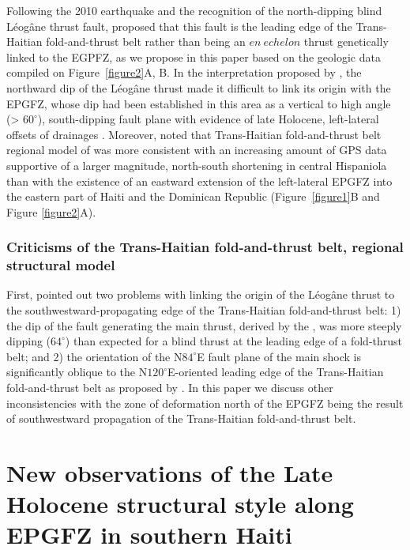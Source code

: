 \documentclass[linenumbers,draft]{agujournal}
\begin{document}
Following the 2010 earthquake and the recognition of the north-dipping blind L\'eog\^ane thrust fault, \citet{calais2010transpressional} proposed that this fault is the leading edge of the Trans-Haitian fold-and-thrust belt rather than being an $en~echelon$ thrust genetically linked to the EGPFZ, as we propose in this paper based on the geologic data compiled on Figure~\ref{figure2}A, B. In the interpretation proposed by \citet{calais2010transpressional}, the northward dip of the L\'eog\^ane thrust made it difficult to link its origin with the EPGFZ, whose dip had been established in this area as a vertical to high angle (> $60^{\circ}$), south-dipping fault plane with evidence of late Holocene, left-lateral offsets of drainages \citep{prentice2010seismic}. Moreover, \citet{symithe2016present} noted that Trans-Haitian fold-and-thrust belt regional model of \citet{pubellier2000plate} was more consistent with an increasing amount of GPS data supportive of a larger magnitude, north-south shortening in central Hispaniola than with the existence of an eastward extension of the left-lateral EPGFZ into the eastern part of Haiti and the Dominican Republic (Figure~\ref{figure1}B and Figure \ref{figure2}A).

\subsubsection{Criticisms of the Trans-Haitian fold-and-thrust belt, regional structural model}
First, \citet{mercier20112010} pointed out two problems with linking the origin of the L\'eog\^ane thrust to the southwestward-propagating edge of the Trans-Haitian fold-and-thrust belt: 1) the dip of the fault generating the main thrust, derived by the \citet{mercier20112010}, was more steeply dipping ($64^{\circ}$) than expected for a blind thrust at the leading edge of a fold-thrust belt; and 2) the orientation of the N$84^{\circ}$E fault plane of the main shock is significantly oblique to the N$120^{\circ}$E-oriented leading edge of the Trans-Haitian fold-and-thrust belt as proposed by \citet{pubellier2000plate}. In this paper we discuss other inconsistencies with the zone of deformation north of the EPGFZ being the result of southwestward propagation of the Trans-Haitian fold-and-thrust belt.

\section{New observations of the Late Holocene structural style along EPGFZ in southern Haiti}
\end{document}
